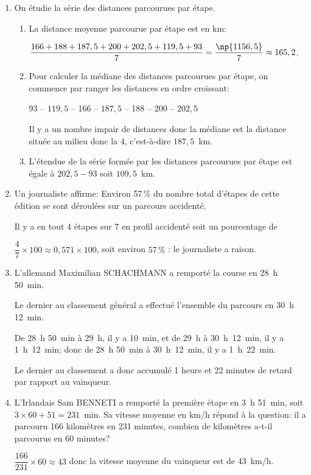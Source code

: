 \begin{enumerate}
\item On étudie la série des distances parcourues par étape.
	\begin{enumerate}
		\item La distance moyenne parcourue par étape est en km:%
		
$\dfrac{166+188+187,5+200+202,5+119,5+93}{7}=\dfrac{\np{1156,5}}{7} \approx 165,2$.
		
		\item Pour calculer la médiane des distances parcourues par étape, on commence par ranger les distances en ordre croissant:
		
93 -- $119,5$ -- 166 -- $187,5$ -- 188 -- 200 -- $202,5$

Il y a un nombre impair de distances donc la médiane est la distance située \og au milieu \fg{} donc la 4\ieme{}, c'est-à-dire $187,5$~km.
		
		\item L'étendue de la série formée par les distances parcourues par étape est égale à $202,5-93$ soit $109,5$~km.
	\end{enumerate}	
	
\item Un journaliste affirme: \og Environ 57\,\% du nombre total d'étapes de cette édition se sont déroulées sur un parcours accidenté. \fg{} 

Il y a en tout 4 étapes sur 7 en profil accidenté soit un pourcentage de 

$\dfrac{4}{7} \times 100 \approx 0,571 \times 100$, soit environ $57\,\%$ : le journaliste a raison.
%
%

\item L'allemand Maximilian SCHACHMANN a remporté la course en 28~h 50~min.

Le dernier au classement général a effectué l'ensemble du parcours en 30~h 12~min.

De 28~h 50~min à 29~h, il y a 10~min, et de 29~h à 30~h~12~min, il y a 1~h~12~min; donc de 28~h 50~min à 30~h~12~min, il y a 1~h~22~min.

Le dernier au classement a donc  accumulé 1 heure et 22 minutes de retard par rapport au vainqueur.

\item L'Irlandais Sam BENNETI a remporté la première étape en 3~h 51~min, soit $3\times 60+51=231$~min.
Sa vitesse moyenne en km/h répond à la question: il a parcouru 166 kilomètres en 231 minutes, combien de kilomètres  a-t-il parcourus en 60 minutes?

$\dfrac{166}{231}\times 60 \approx 43$ donc la vitesse moyenne du vainqueur est de 43~km/h.

\end{enumerate}

\bigskip


